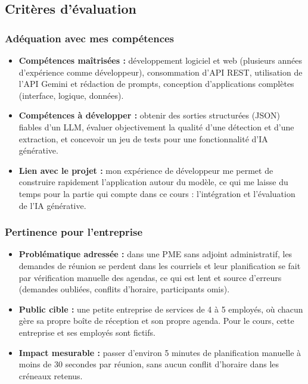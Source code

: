 \documentclass[11pt,letterpaper]{article}
\begin{document}
\subsection{Critères d'évaluation}

\subsubsection{Adéquation avec mes compétences}

\begin{itemize}
  \item \textbf{Compétences maîtrisées :} développement logiciel et web (plusieurs années d'expérience comme développeur), consommation d'API REST, utilisation de l'API Gemini et rédaction de prompts, conception d'applications complètes (interface, logique, données).
  \item \textbf{Compétences à développer :} obtenir des sorties structurées (JSON) fiables d'un LLM, évaluer objectivement la qualité d'une détection et d'une extraction, et concevoir un jeu de tests pour une fonctionnalité d'IA générative.
  \item \textbf{Lien avec le projet :} mon expérience de développeur me permet de construire rapidement l'application autour du modèle, ce qui me laisse du temps pour la partie qui compte dans ce cours : l'intégration et l'évaluation de l'IA générative.
\end{itemize}

\subsubsection{Pertinence pour l'entreprise}

\begin{itemize}
  \item \textbf{Problématique adressée :} dans une PME sans adjoint administratif, les demandes de réunion se perdent dans les courriels et leur planification se fait par vérification manuelle des agendas, ce qui est lent et source d'erreurs (demandes oubliées, conflits d'horaire, participants omis).
  \item \textbf{Public cible :} une petite entreprise de services de 4 à 5 employés, où chacun gère sa propre boîte de réception et son propre agenda. Pour le cours, cette entreprise et ses employés sont fictifs.
  \item \textbf{Impact mesurable :} passer d'environ 5 minutes de planification manuelle à moins de 30 secondes par réunion, sans aucun conflit d'horaire dans les créneaux retenus.
\end{itemize}
\end{document}
